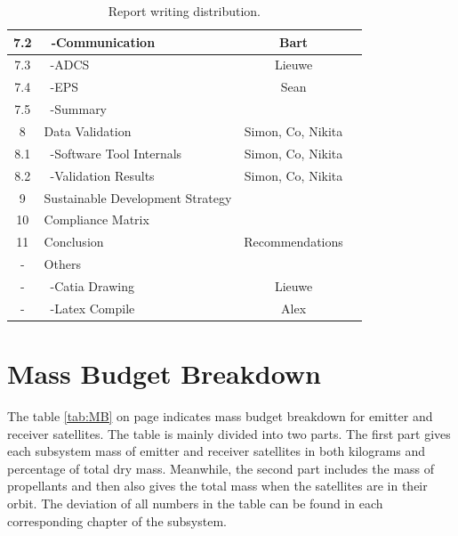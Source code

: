 \begin{table}[ht!]
{\begin{tabular}{|c|l|c|c|}
 7.2     & \ -Communication                     & Bart &\\\hline
 7.3     & \ -ADCS                              & Lieuwe &\\\hline
 7.4     & \ -EPS                               & Sean &\\\hline
 7.5     & \ -Summary                           &\\\hline\hline
 8       & Data Validation                      & Simon, Co, Nikita &\\\hline
 8.1     & \ -Software Tool Internals           & Simon, Co, Nikita &\\\hline
 8.2     & \ -Validation Results                & Simon, Co, Nikita &\\\hline
 9       & Sustainable Development Strategy     &\\\hline
 10      & Compliance Matrix                    &\\\hline\hline
 11      & Conclusion & Recommendations         &\\\hline\hline
 -       & Others                               &\\\hline
 -       & \ -Catia Drawing                     & Lieuwe &\\\hline
 -       & \ -Latex Compile                     & Alex &\\\hline

\end{tabular}
}
\caption{Report writing distribution.}
\label{tab:RWD}
\end{table}

\section{Mass Budget Breakdown}
\label{DDMBB}
The table \ref{tab:MB} on page \pageref{tab:MB} indicates mass budget breakdown for emitter and receiver satellites. The table is mainly divided into two parts. The first part gives each subsystem mass of emitter and receiver satellites in both kilograms and percentage of total dry mass. Meanwhile, the second part includes the mass of propellants and then also gives the total mass when the satellites are in their orbit. The deviation of all numbers in the table can be found in each corresponding chapter of the subsystem.

